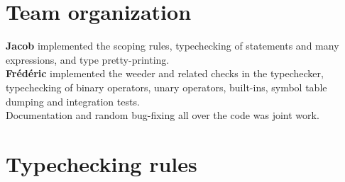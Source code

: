 \documentclass[letterpaper,11pt]{article}
\begin{document}
\section{Team organization}

\textbf{Jacob} implemented the scoping rules, typechecking of statements and many expressions, and type pretty-printing.
\\
\textbf{Fr\'ed\'eric} implemented the weeder and related checks in the typechecker, typechecking of binary operators, unary operators, built-ins, symbol table dumping and integration tests.
\\
Documentation and random bug-fixing all over the code was joint work.

\section{Typechecking rules}
\end{document}
